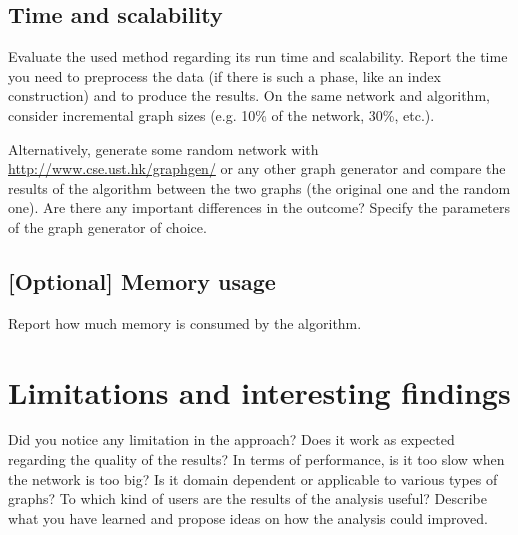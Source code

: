 \documentclass[11pt,a4paper,onecolumn,notitlepage]{article}
\begin{document}
\subsection{Time and scalability}

Evaluate the used method regarding its run time and scalability. Report the time you need to preprocess  the data (if there is such a phase, like an index construction) and to produce the results. On the same network and algorithm, consider incremental graph sizes (e.g. 10\% of the network, 30\%, etc.). 

\smallskip
\noindent Alternatively, generate some random network with \url{http://www.cse.ust.hk/graphgen/} or any other graph generator and compare the results of the algorithm between the two graphs (the original one and the random one). Are there any important differences in the outcome? Specify the parameters of the graph generator of choice. 


\subsection{[Optional] Memory usage}
Report how much memory is consumed by the algorithm. 


\section{Limitations and interesting findings}

Did you notice any limitation in the approach? Does it work as expected regarding the quality of the results? In terms of performance, is it too slow when the network is too big? Is it domain dependent or applicable to various types of graphs? To which kind of users are the results of the analysis useful? Describe what you have learned and propose ideas on how the analysis could improved. 




  
\end{document}
